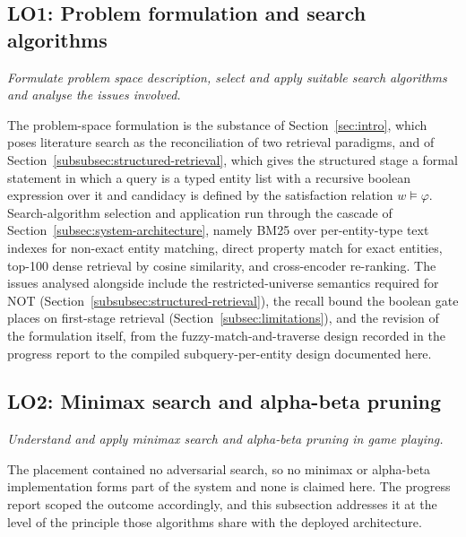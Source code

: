 \subsection{LO1: Problem formulation and search algorithms}
\textit{Formulate problem space description, select and apply suitable
search algorithms and analyse the issues involved.}

The problem-space formulation is the substance of Section~\ref{sec:intro},
which poses literature search as the reconciliation of two retrieval
paradigms, and of Section~\ref{subsubsec:structured-retrieval}, which gives the structured
stage a formal statement in which a query is a typed entity list with a
recursive boolean expression over it and candidacy is defined by the
satisfaction relation $w \models \varphi$. Search-algorithm selection and
application run through the cascade of
Section~\ref{subsec:system-architecture}, namely BM25 over per-entity-type
text indexes for non-exact entity matching, direct property match for exact
entities, top-100 dense retrieval by cosine similarity, and cross-encoder
re-ranking. The issues analysed alongside include the restricted-universe
semantics required for NOT (Section~\ref{subsubsec:structured-retrieval}),
the recall bound the boolean gate places on first-stage retrieval
(Section~\ref{subsec:limitations}), and the revision of the formulation
itself, from the fuzzy-match-and-traverse design recorded in the progress
report to the compiled subquery-per-entity design documented here.

\subsection{LO2: Minimax search and alpha-beta pruning}
\textit{Understand and apply minimax search and alpha-beta pruning in game
playing.}

The placement contained no adversarial search, so no minimax or alpha-beta
implementation forms part of the system and none is claimed here. The
progress report scoped the outcome accordingly, and this subsection
addresses it at the level of the principle those algorithms share with the
deployed architecture.

